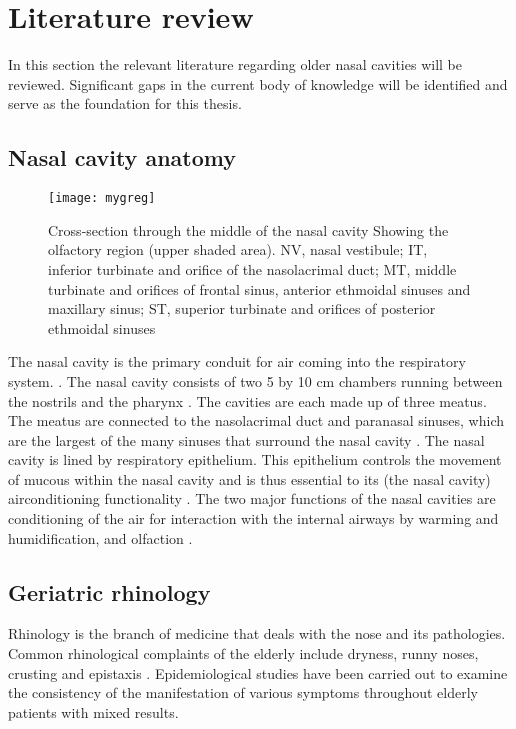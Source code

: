 \section{Literature review}
In this section the relevant literature regarding older nasal cavities will be reviewed. Significant gaps in the current body of knowledge will be identified and serve as the foundation for this thesis.

\subsection{Nasal cavity anatomy}


\begin{figure}
\centering
\texttt{[image: mygreg]}
\caption{Cross-section through the middle of the nasal cavity Showing the olfactory region (upper shaded area). NV, nasal vestibule; IT, inferior turbinate and orifice of the nasolacrimal duct; MT, middle turbinate and orifices of frontal sinus, anterior ethmoidal sinuses and maxillary sinus; ST, superior turbinate and orifices of posterior ethmoidal sinuses \cite{Mygind1998}}
  
\label{fig:regions1}
\end{figure} 


The nasal cavity is the primary conduit for air coming into the respiratory system. \cite{Elad2008}. The nasal cavity consists of two 5 by 10 cm chambers running between the nostrils and the pharynx \cite{Mygind1998}. The cavities are each made up of three meatus. The meatus are connected to the nasolacrimal duct and paranasal sinuses, which are the largest of the many sinuses that surround the nasal cavity \cite{Mygind1998}. 
The nasal cavity is lined by respiratory epithelium. This epithelium controls the movement of mucous within the nasal cavity and is thus essential to its (the nasal cavity) airconditioning functionality \cite{Mygind1998}.
The two major functions of the nasal cavities are conditioning of the air for interaction with the internal airways by warming and humidification, and olfaction \cite{Doorly2008, Elad2008, Mygind1998, Berglund1982}.

\subsection{Geriatric rhinology}
Rhinology is the branch of medicine that deals with the nose and its pathologies. 
Common rhinological complaints of the elderly include dryness, runny noses, crusting and epistaxis \cite{Varga-Huettner2013}. Epidemiological studies have been carried out to examine the consistency of the manifestation of various symptoms throughout elderly patients with mixed results. 

